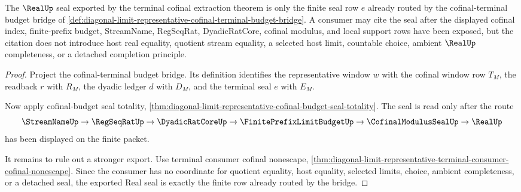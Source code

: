 \begin{theorem}
\label{thm:diagonal-limit-representative-real-seal-extraction}
The $\RealUp$ seal exported by the terminal cofinal extraction theorem is only the finite seal row $e$ already routed by the cofinal-terminal budget bridge of \autoref{def:diagonal-limit-representative-cofinal-terminal-budget-bridge}. A consumer may cite the seal after the displayed cofinal index, finite-prefix budget, StreamName, RegSeqRat, DyadicRatCore, cofinal modulus, and local support rows have been exposed, but the citation does not introduce host real equality, quotient stream equality, a selected host limit, countable choice, ambient $\RealUp$ completeness, or a detached completion principle.
\end{theorem}
\begin{proof}
Project the cofinal-terminal budget bridge. Its definition identifies the representative window $w$ with the cofinal window row $T_M$, the readback $r$ with $R_M$, the dyadic ledger $d$ with $D_M$, and the terminal seal $e$ with $E_M$.

Now apply cofinal-budget seal totality, \autoref{thm:diagonal-limit-representative-cofinal-budget-seal-totality}. The seal is read only after the route
$$
\StreamNameUp \to \RegSeqRatUp \to \DyadicRatCoreUp \to \FinitePrefixLimitBudgetUp \to \CofinalModulusSealUp \to \RealUp
$$
has been displayed on the finite packet.

It remains to rule out a stronger export. Use terminal consumer cofinal nonescape, \autoref{thm:diagonal-limit-representative-terminal-consumer-cofinal-nonescape}. Since the consumer has no coordinate for quotient equality, host equality, selected limits, choice, ambient completeness, or a detached seal, the exported Real seal is exactly the finite row already routed by the bridge.
\end{proof}


